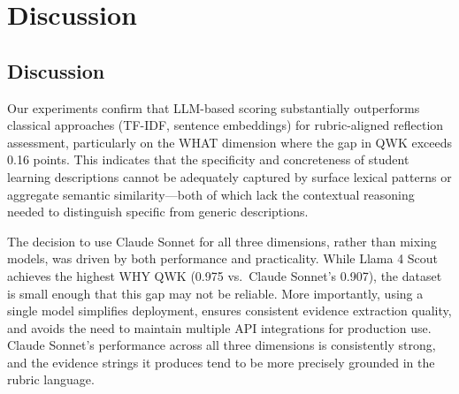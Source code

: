 \documentclass[11pt]{article}
\begin{document}


\section{Discussion}
\subsection{Discussion}
Our experiments confirm that LLM-based scoring substantially outperforms classical approaches (TF-IDF, sentence embeddings) for rubric-aligned reflection assessment, particularly on the WHAT dimension where the gap in QWK exceeds 0.16 points. This indicates that the specificity and concreteness of student learning descriptions cannot be adequately captured by surface lexical patterns or aggregate semantic similarity—both of which lack the contextual reasoning needed to distinguish specific from generic descriptions.

The decision to use Claude Sonnet for all three dimensions, rather than mixing models, was driven by both performance and practicality. While Llama 4 Scout achieves the highest WHY QWK (0.975 vs.\ Claude Sonnet's 0.907), the dataset is small enough that this gap may not be reliable. More importantly, using a single model simplifies deployment, ensures consistent evidence extraction quality, and avoids the need to maintain multiple API integrations for production use. Claude Sonnet's performance across all three dimensions is consistently strong, and the evidence strings it produces tend to be more precisely grounded in the rubric language.
\end{document}
